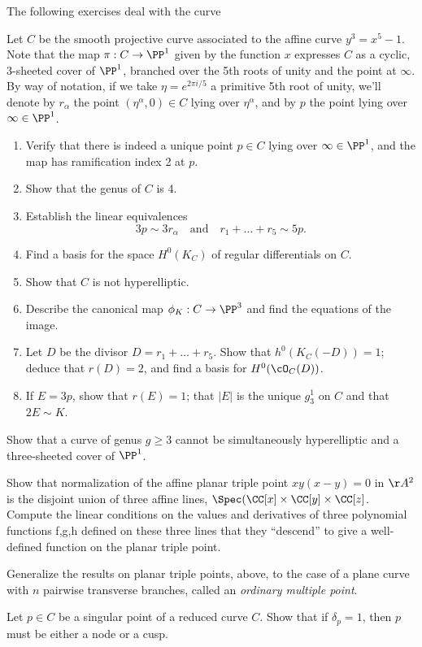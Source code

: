 The following exercises deal with the curve 
\begin{exercise}
Let $C$ be the smooth projective curve associated to the affine curve $y^3 = x^5 -1$. Note that the map $\pi : C \to \PP^1$ given by the function $x$ expresses $C$ as a cyclic, 3-sheeted cover of $\PP^1$, branched over the 5th roots of unity and the point at $\infty$. By way of notation, if we take $\eta = e^{2\pi i/5}$ a primitive 5th root of unity, we'll denote by $r_\alpha$ the point $(\eta^\alpha, 0) \in C$ lying over $\eta^\alpha$, and by $p$ the point lying over $\infty \in \PP^1$.

\begin{enumerate}
\item Verify that there is indeed a unique point $p \in C$ lying over $\infty \in \PP^1$, and the map has ramification index 2 at $p$. 
\item Show that the genus of $C$ is 4.
\item Establish the linear equivalences
$$
3p \sim 3r_\alpha \quad \text{and} \quad r_1+ \dots + r_5 \sim 5p.
$$
\item Find a basis for the space $H^0(K_C)$ of regular differentials on $C$.
\item Show that $C$ is not hyperelliptic.
\item Describe the canonical map $\phi_K : C \to \PP^3$ and find the equations of the image.
\item Let $D$ be the divisor $D = r_1+\dots+r_5$. Show that $h^0(K_C(-D)) = 1$; deduce that $r(D) = 2$, and find a basis for $H^0(\cO_C(D))$.
\item If $E = 3p$, show that $r(E) = 1$; that $|E|$ is the unique $g^1_3$ on $C$ and that $2E \sim K$.
\end{enumerate}
\end{exercise}


\begin{exercise}\label{gonality exclusion}
Show that a curve of genus $g \geq 3$ cannot be simultaneously hyperelliptic and a three-sheeted cover of $\PP^1$.
\end{exercise}

\begin{exercise}
Show that normalization of the affine planar triple point $xy(x-y) = 0$ in $\AA^2$ is the disjoint union of three
affine lines, $\Spec(\CC[x] \times \CC[y]\times \CC[z]$. Compute the linear conditions on the values and derivatives of three polynomial functions f,g,h defined on
these three lines that they ``descend'' to give a well-defined function on the planar triple point.
\end{exercise}

\begin{exercise} Generalize the results on planar triple points, above, to the case of a plane curve with $n$ pairwise
transverse branches, called an \emph{ordinary multiple point}.
\end{exercise}

\begin{exercise}
Let $p \in C$ be a singular point of a reduced curve $C$. Show that if $\delta_p = 1$, then $p$ must be either a node or a cusp.
\end{exercise}



 
